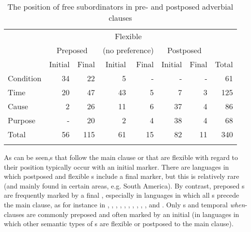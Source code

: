 \documentclass[output=paper]{langsci/langscibook}
\begin{document}
\begin{table}
\begin{tabularx}{\textwidth}{X rr  rr rr  r}
\lsptoprule
& & & \multicolumn{2}{c}{Flexible}\\
& \multicolumn{2}{c}{Preposed} &  \multicolumn{2}{c}{(no preference)} &  \multicolumn{2}{c}{Postposed} \\
\cmidrule(lr){2-3}\cmidrule(lr){4-5}\cmidrule(lr){6-7}
&   Initial &   Final &   Initial &   Final &   Initial &   Final & Total\\
\midrule
{Condition} 	& 34 	& 22 	& 5 	& - 	& - 	& - 	& 61\\
{Time} 		& 20 	& 47 	& 43 	& 5 	& 7 	& 3 	& 125\\
{Cause} 	& 2 	& 26 	& 11 	& 6 	& 37 	& 4 	& 86\\
{Purpose} 	& - 	& 20 	& 2 	& 4 	& 38 	& 4 	& 68\\
\midrule
{Total} 	& 56 	& 115 	& 61 	& 15 	& 82 	& 11 	& 340\\
\lspbottomrule
\end{tabularx}

\caption{The position of free subordinators in pre- and postposed adverbial clauses}
\label{tab:diessel:3}
\end{table}
\largerpage
As can be seen,s that follow the main clause or that are flexible with regard to their position typically occur with an initial marker. There are languages in which postposed and flexible s include a final marker, but this is relatively rare (and mainly found in certain areas, e.g. South America). By contrast, preposed s are frequently marked by a final , especially in languages in which all s precede the main clause, as for instance in , , , , , , , , , , and . Only s and temporal \textit{when}-clauses are commonly preposed and often marked by an initial  (in languages in which other semantic types of s \largerpage are flexible or postposed to the main clause). 
\end{document}
